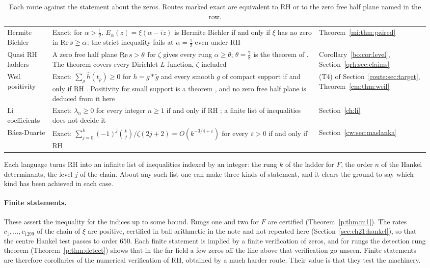 \begin{table}[t]
\begin{tabular}{@{}p{}p{}p{}@{}}
Hermite Biehler & Exact: for $\alpha>\frac12$, $E_\alpha(z)=\xi(\alpha-iz)$ is Hermite Biehler if and only if $\xi$ has no zero in $\operatorname{Re} s\ge\alpha$; the strict inequality fails at $\alpha=\frac12$ even under RH & Theorem~\ref{mi:thm:paired} \\
Quasi RH ladders & A zero free half plane $\operatorname{Re} s>\theta$ for $\zeta$ gives every rung $\alpha\ge\theta$; $\theta=\frac78$ is the theorem of \cite{OAI26a}. The theorem covers every Dirichlet $L$ function, $\zeta$ included & Corollary~\ref{bo:cor:level}, Section~\ref{qrh:sec:claims} \\
Weil positivity & Exact: $\sum_\rho\widehat h(t_\rho)\ge0$ for $h=g*\tilde g$ and every smooth $g$ of compact support if and only if RH \cite{Weil52}. Positivity for small support is a theorem \cite{Yoshida92}, and no zero free half plane is deduced from it here & (T4) of Section~\ref{route:sec:target}, Theorem~\ref{cm:thm:weil} \\
Li coefficients & Exact: $\lambda_n\ge0$ for every integer $n\ge1$ if and only if RH \cite{Li97,BL99}; a finite list of inequalities does not decide it & Section~\ref{ch:li} \\
B\'aez-Duarte & Exact: $\sum_{j=0}^k(-1)^j\binom kj/\zeta(2j+2)=O(k^{-3/4+\varepsilon})$ for every $\varepsilon>0$ if and only if RH \cite{BaezDuarte03} & Section~\ref{cw:sec:maslanka} \\
\bottomrule
\end{tabular}
\caption{Each route against the statement about the zeros. Routes marked exact are equivalent to RH or to the zero free half plane named in the row.}
\label{d:tab:routemap}
\end{table}


Each language turns RH into an infinite list of inequalities indexed by an integer: the rung $k$ of the ladder for $F$, the order $n$ of the Hankel determinants, the level $j$ of the chain. About any such list one can make three kinds of statement, and it clears the ground to say which kind has been achieved in each case.

\paragraph{Finite statements.} These assert the inequality for the indices up to some bound. Rungs one and two for $F$ are certified (Theorem~\ref{p:thm:m1}). The rates $c_1,\dots,c_{1299}$ of the chain of $\xi$ are positive, certified in ball arithmetic in the note and not repeated here (Section~\ref{sec:ch21:hankel}), so that the centre Hankel test passes to order $650$. Each finite statement is implied by a finite verification of zeros, and for rungs the detection rung theorem (Theorem~\ref{p:thm:detect}) shows that in the far field a few zeros off the line above that verification go unseen. Finite statements are therefore corollaries of the numerical verification of RH, obtained by a much harder route. Their value is that they test the machinery.

